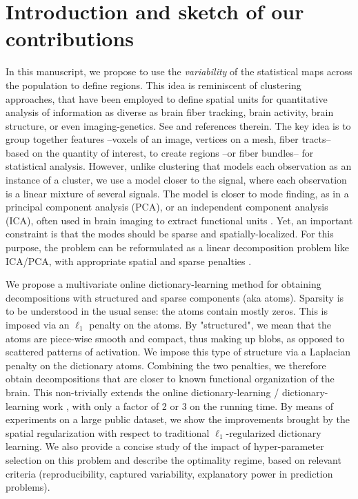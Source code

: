 \section{Introduction and sketch of our contributions}
\label{sec:intro}
In this manuscript, we propose to use the \textit{variability} of the statistical
maps across the population to define regions.
%
This idea is reminiscent of
clustering approaches, that have been employed to define spatial units
for quantitative analysis of information as diverse as brain fiber
tracking, brain activity, brain structure, or even imaging-genetics. See   \citep{Varol2014,hibar2013genetic} and references therein.
%
The key idea is to group together features --voxels of an image,
vertices on a mesh, fiber tracts-- based on the quantity of interest, to
create regions --or fiber bundles-- for statistical analysis. However,
unlike clustering that models each observation as an instance of a
cluster, we use a model closer to the signal, where each observation is a
linear mixture of several signals. The model is closer to mode finding,
as in a principal component analysis (PCA), or an independent component
analysis (ICA), often used in brain imaging to extract functional units
  \citep{beckmann2004}. Yet, an important constraint is that the modes
 should be sparse and spatially-localized. For this purpose, the problem can be reformulated as a linear decomposition problem like ICA/PCA, with
 appropriate spatial and sparse penalties   \citep{varoquaux2011,abraham2013}. 

We propose a multivariate online dictionary-learning method for obtaining
decompositions with structured and sparse components (aka atoms).
Sparsity is to be understood in the usual sense: the atoms contain mostly
zeros. This is imposed via an $\ell_1$ penalty on the atoms. 
%
By "structured", we mean that the atoms are piece-wise smooth and
compact, thus making up blobs, as opposed to scattered patterns of
activation. We impose this type of structure via a Laplacian penalty on the
dictionary atoms. Combining the two penalties, we therefore
obtain decompositions that are closer to known functional organization of the brain. This non-trivially extends the online dictionary-learning /
dictionary-learning work   \citep{mairal2010}, with only a factor of 2
or 3 on the running time.
%
By means of experiments on a large public dataset, we show the
improvements brought by the spatial regularization with respect to
traditional $\ell_1$-regularized dictionary learning.
%
We also provide a concise study of the impact of
hyper-parameter selection on this problem and describe the optimality
regime, based on relevant criteria (reproducibility, captured
variability, explanatory power in prediction problems).

